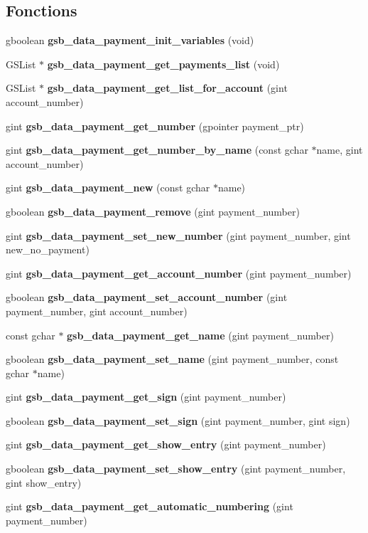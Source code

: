 \subsection*{Fonctions}
\begin{DoxyCompactItemize}
\item 
gboolean {\bf gsb\_\-data\_\-payment\_\-init\_\-variables} (void)
\item 
GSList $\ast$ {\bf gsb\_\-data\_\-payment\_\-get\_\-payments\_\-list} (void)
\item 
GSList $\ast$ {\bf gsb\_\-data\_\-payment\_\-get\_\-list\_\-for\_\-account} (gint account\_\-number)
\item 
gint {\bf gsb\_\-data\_\-payment\_\-get\_\-number} (gpointer payment\_\-ptr)
\item 
gint {\bf gsb\_\-data\_\-payment\_\-get\_\-number\_\-by\_\-name} (const gchar $\ast$name, gint account\_\-number)
\item 
gint {\bf gsb\_\-data\_\-payment\_\-new} (const gchar $\ast$name)
\item 
gboolean {\bf gsb\_\-data\_\-payment\_\-remove} (gint payment\_\-number)
\item 
gint {\bf gsb\_\-data\_\-payment\_\-set\_\-new\_\-number} (gint payment\_\-number, gint new\_\-no\_\-payment)
\item 
gint {\bf gsb\_\-data\_\-payment\_\-get\_\-account\_\-number} (gint payment\_\-number)
\item 
gboolean {\bf gsb\_\-data\_\-payment\_\-set\_\-account\_\-number} (gint payment\_\-number, gint account\_\-number)
\item 
const gchar $\ast$ {\bf gsb\_\-data\_\-payment\_\-get\_\-name} (gint payment\_\-number)
\item 
gboolean {\bf gsb\_\-data\_\-payment\_\-set\_\-name} (gint payment\_\-number, const gchar $\ast$name)
\item 
gint {\bf gsb\_\-data\_\-payment\_\-get\_\-sign} (gint payment\_\-number)
\item 
gboolean {\bf gsb\_\-data\_\-payment\_\-set\_\-sign} (gint payment\_\-number, gint sign)
\item 
gint {\bf gsb\_\-data\_\-payment\_\-get\_\-show\_\-entry} (gint payment\_\-number)
\item 
gboolean {\bf gsb\_\-data\_\-payment\_\-set\_\-show\_\-entry} (gint payment\_\-number, gint show\_\-entry)
\item 
gint {\bf gsb\_\-data\_\-payment\_\-get\_\-automatic\_\-numbering} (gint payment\_\-number)
\item 

\end{DoxyCompactItemize}
